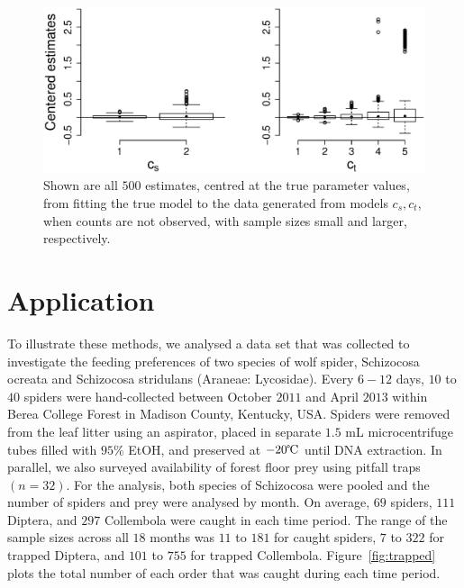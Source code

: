 \documentclass[12pt]{article}
\begin{document}
\begin{figure}
  \centering
  \includegraphics[scale=0.5]{em_bp}
  \caption{Shown are all $500$ estimates, centred at the true parameter values, from fitting the true model to the data generated from models $c_s,c_t$, when counts are not observed, with sample sizes small and larger, respectively.}
  \label{fig:em_bp}
\end{figure}

\section{Application}
\label{sec:data}

To illustrate these methods, we analysed a data set that was collected to investigate the feeding preferences of two species of wolf spider, Schizocosa ocreata and Schizocosa stridulans (Araneae: Lycosidae).  Every $6-12$ days, $10$ to $40$ spiders were hand-collected between October $2011$ and April $2013$ within Berea College Forest in Madison County, Kentucky, USA.  Spiders were removed from the leaf litter using an aspirator, placed in separate $1.5$ mL microcentrifuge tubes filled with $95$\% EtOH, and preserved at $-20\celsius$ until DNA extraction.  In parallel, we also surveyed availability of forest floor prey using pitfall traps $(n = 32)$.  For the analysis, both species of Schizocosa were pooled and the number of spiders and prey were analysed by month.  On average, $69$ spiders, $111$ Diptera, and $297$ Collembola were caught in each time period.  The range of the sample sizes across all $18$ months was $11$ to $181$ for caught spiders, $7$ to $322$ for trapped Diptera, and $101$ to $755$ for trapped Collembola.  Figure~\ref{fig:trapped} plots the total number of each order that was caught during each time period.
\end{document}
